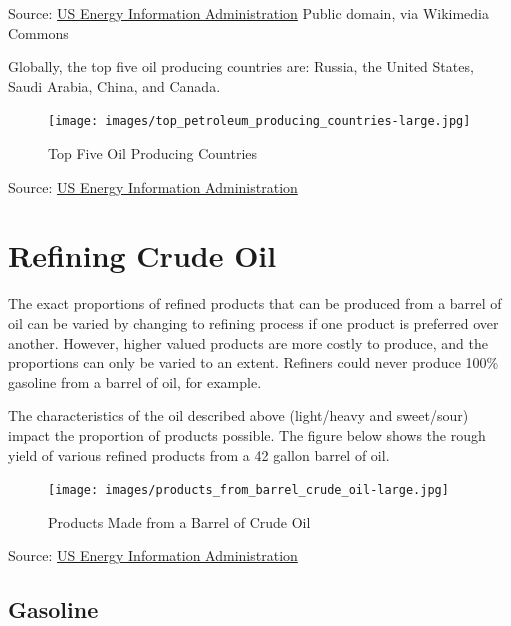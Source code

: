 \documentclass[
  letterpaper,
  DIV=11,
  numbers=noendperiod]{scrreprt}
\begin{document}
Source: \href{http://www.eia.gov/countries/cab.cfm?fips=UK}{US Energy
Information Administration} Public domain, via Wikimedia Commons

Globally, the top five oil producing countries are: Russia, the United
States, Saudi Arabia, China, and Canada.

\begin{figure}

{\centering \texttt{[image: images/top\_petroleum\_producing\_countries-large.jpg]}

}

\caption{Top Five Oil Producing Countries}

\end{figure}

Source:
\href{http://www.eia.gov/Energyexplained/index.cfm?page=oil_home}{US
Energy Information Administration}

\hypertarget{refining-crude-oil}{%
\section{Refining Crude Oil}\label{refining-crude-oil}}

The exact proportions of refined products that can be produced from a
barrel of oil can be varied by changing to refining process if one
product is preferred over another. However, higher valued products are
more costly to produce, and the proportions can only be varied to an
extent. Refiners could never produce 100\% gasoline from a barrel of
oil, for example.

The characteristics of the oil described above (light/heavy and
sweet/sour) impact the proportion of products possible. The figure below
shows the rough yield of various refined products from a 42 gallon
barrel of oil.

\begin{figure}

{\centering \texttt{[image: images/products\_from\_barrel\_crude\_oil-large.jpg]}

}

\caption{Products Made from a Barrel of Crude Oil}

\end{figure}

Source:
\href{http://www.eia.gov/Energyexplained/index.cfm?page=oil_home}{US
Energy Information Administration}

\hypertarget{gasoline}{%
\subsection{Gasoline}\label{gasoline}}
\end{document}
